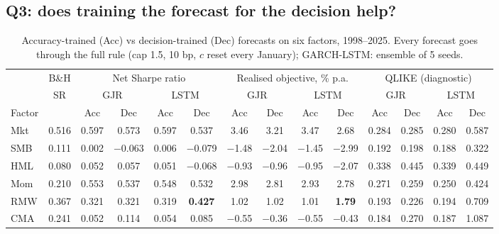 \FloatBarrier
\subsection{Q3: does training the forecast for the decision help?}\label{sec:q3}

\begin{table}[htbp]
\centering\footnotesize
\caption{Accuracy-trained (Acc) vs decision-trained (Dec) forecasts on six factors, 1998--2025. Every forecast goes through the full rule (cap 1.5, 10 bp, $c$ reset every January); GARCH-LSTM: ensemble of 5 seeds.}\label{tab:q3}
\setlength{\tabcolsep}{3.5pt}
\begin{adjustbox}{max width=\linewidth}\begin{tabular}{@{}lccccccccccccc@{}}
\toprule
 & B\&H & \multicolumn{4}{c}{Net Sharpe ratio} & \multicolumn{4}{c}{Realised objective, \% p.a.} & \multicolumn{4}{c}{QLIKE (diagnostic)}\\
\cmidrule(lr){3-6}\cmidrule(lr){7-10}\cmidrule(lr){11-14}
 & SR & \multicolumn{2}{c}{GJR} & \multicolumn{2}{c}{LSTM} & \multicolumn{2}{c}{GJR} & \multicolumn{2}{c}{LSTM} & \multicolumn{2}{c}{GJR} & \multicolumn{2}{c}{LSTM}\\
Factor & & Acc & Dec & Acc & Dec & Acc & Dec & Acc & Dec & Acc & Dec & Acc & Dec\\
\midrule
Mkt & 0.516 & 0.597 & 0.573 & 0.597 & 0.537 & 3.46 & 3.21 & 3.47 & 2.68 & 0.284 & 0.285 & 0.280 & 0.587\\
SMB & 0.111 & 0.002 & $-$0.063 & 0.006 & $-$0.079 & $-$1.48 & $-$2.04 & $-$1.45 & $-$2.99 & 0.192 & 0.198 & 0.188 & 0.322\\
HML & 0.080 & 0.052 & 0.057 & 0.051 & $-$0.068 & $-$0.93 & $-$0.96 & $-$0.95 & $-$2.07 & 0.338 & 0.445 & 0.339 & 0.449\\
Mom & 0.210 & 0.553 & 0.537 & 0.548 & 0.532 & 2.98 & 2.81 & 2.93 & 2.78 & 0.271 & 0.259 & 0.250 & 0.424\\
RMW & 0.367 & 0.321 & 0.321 & 0.319 & \textbf{0.427} & 1.02 & 1.02 & 1.01 & \textbf{1.79} & 0.193 & 0.226 & 0.194 & 0.709\\
CMA & 0.241 & 0.052 & 0.114 & 0.054 & 0.085 & $-$0.55 & $-$0.36 & $-$0.55 & $-$0.43 & 0.184 & 0.270 & 0.187 & 1.087\\
\bottomrule
\end{tabular}\end{adjustbox}
\end{table}

